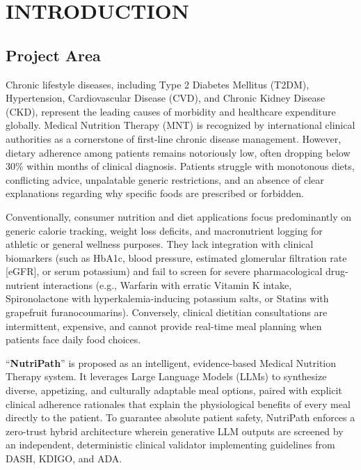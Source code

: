 \documentclass[a4paper,12pt]{report}
\begin{document}
\renewcommand{\chaptername}{CHAPTER}
\chapter{INTRODUCTION}

\section{Project Area}
\par
Chronic lifestyle diseases, including Type 2 Diabetes Mellitus (T2DM), Hypertension, Cardiovascular Disease (CVD), and Chronic Kidney Disease (CKD), represent the leading causes of morbidity and healthcare expenditure globally. Medical Nutrition Therapy (MNT) is recognized by international clinical authorities as a cornerstone of first-line chronic disease management. However, dietary adherence among patients remains notoriously low, often dropping below 30\% within months of clinical diagnosis. Patients struggle with monotonous diets, conflicting advice, unpalatable generic restrictions, and an absence of clear explanations regarding why specific foods are prescribed or forbidden.

Conventionally, consumer nutrition and diet applications focus predominantly on generic calorie tracking, weight loss deficits, and macronutrient logging for athletic or general wellness purposes. They lack integration with clinical biomarkers (such as HbA1c, blood pressure, estimated glomerular filtration rate [eGFR], or serum potassium) and fail to screen for severe pharmacological drug-nutrient interactions (e.g., Warfarin with erratic Vitamin K intake, Spironolactone with hyperkalemia-inducing potassium salts, or Statins with grapefruit furanocoumarins). Conversely, clinical dietitian consultations are intermittent, expensive, and cannot provide real-time meal planning when patients face daily food choices.

``\textbf{NutriPath}'' is proposed as an intelligent, evidence-based Medical Nutrition Therapy system. It leverages Large Language Models (LLMs) to synthesize diverse, appetizing, and culturally adaptable meal options, paired with explicit clinical adherence rationales that explain the physiological benefits of every meal directly to the patient. To guarantee absolute patient safety, NutriPath enforces a zero-trust hybrid architecture wherein generative LLM outputs are screened by an independent, deterministic clinical validator implementing guidelines from DASH, KDIGO, and ADA.
\end{document}
